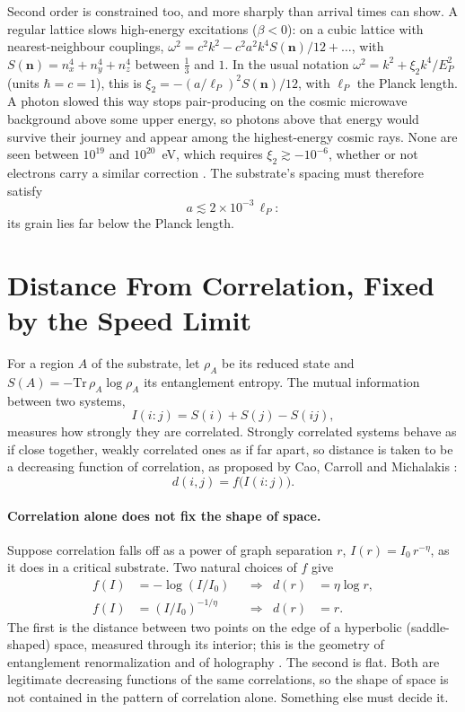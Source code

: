 \documentclass[aps,prd,onecolumn,nofootinbib,superscriptaddress]{revtex4-2}
\begin{document}
Second order is constrained too, and more sharply than arrival times can show. A regular lattice slows high-energy excitations ($\beta<0$): on a cubic lattice with nearest-neighbour couplings, $\omega^2 = c^2 k^2 - c^2 a^2 k^4 S(\mathbf{n})/12 + \dots$, with $S(\mathbf{n}) = n_x^4+n_y^4+n_z^4$ between $\tfrac13$ and $1$. In the usual notation $\omega^2 = k^2 + \xi_2 k^4/E_P^2$ (units $\hbar = c = 1$), this is $\xi_2 = -(a/\ell_P)^2 S(\mathbf{n})/12$, with $\ell_P$ the Planck length. A photon slowed this way stops pair-producing on the cosmic microwave background above some upper energy, so photons above that energy would survive their journey and appear among the highest-energy cosmic rays. None are seen between $10^{19}$ and $10^{20}$~eV, which requires $\xi_2 \gtrsim -10^{-6}$, whether or not electrons carry a similar correction \cite{galaverni2008a, galaverni2008b}. The substrate's spacing must therefore satisfy
\begin{equation}
a \lesssim 2\times10^{-3}\,\ell_P :
\label{eq:grain}
\end{equation}
its grain lies far below the Planck length.

\section{Distance From Correlation, Fixed by the Speed Limit}
\label{sec:geometry}

For a region $A$ of the substrate, let $\rho_A$ be its reduced state and $S(A) = -\mathrm{Tr}\,\rho_A\log\rho_A$ its entanglement entropy. The mutual information between two systems,
\begin{equation}
I(i{:}j) = S(i) + S(j) - S(ij),
\end{equation}
measures how strongly they are correlated. Strongly correlated systems behave as if close together, weakly correlated ones as if far apart, so distance is taken to be a decreasing function of correlation, as proposed by Cao, Carroll and Michalakis \cite{cao2017}:
\begin{equation}
d(i,j) = f\big(I(i{:}j)\big).
\end{equation}

\paragraph{Correlation alone does not fix the shape of space.} Suppose correlation falls off as a power of graph separation $r$, $I(r) = I_0\, r^{-\eta}$, as it does in a critical substrate. Two natural choices of $f$ give
\begin{align}
f(I) &= -\log(I/I_0) & &\Rightarrow & d(r) &= \eta\log r, \\
f(I) &= (I/I_0)^{-1/\eta} & &\Rightarrow & d(r) &= r.
\end{align}
The first is the distance between two points on the edge of a hyperbolic (saddle-shaped) space, measured through its interior; this is the geometry of entanglement renormalization \cite{swingle2012} and of holography \cite{maldacena1997, ryutakayanagi2006}. The second is flat. Both are legitimate decreasing functions of the same correlations, so the shape of space is not contained in the pattern of correlation alone. Something else must decide it.
\end{document}

